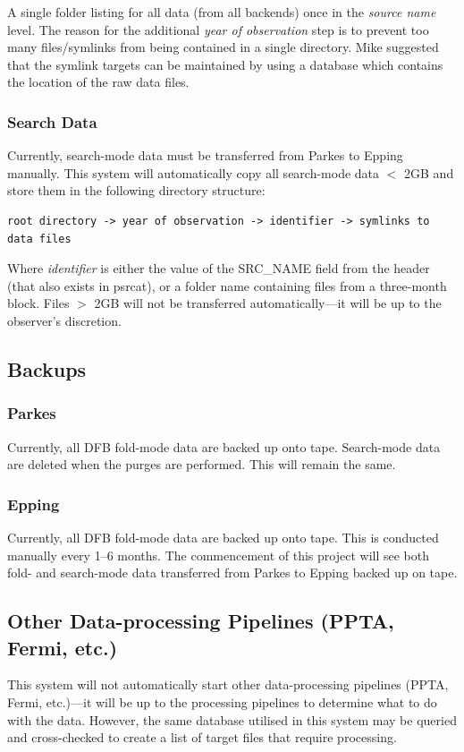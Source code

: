 \documentclass[a4paper,11pt]{article}
\begin{document}
A single folder listing for all data (from all backends) once in the \emph{source name} level. The reason for the additional \emph{year of observation} step is to prevent too many files/symlinks from being contained in a single directory. Mike suggested that the symlink targets can be maintained by using a database which contains the location of the raw data files.

\subsubsection{Search Data}
Currently, search-mode data must be transferred from Parkes to Epping manually. This system will automatically copy all search-mode data $<$ 2GB and store them in the following directory structure:

\begin{verbatim}
root directory -> year of observation -> identifier -> symlinks to data files
\end{verbatim}

Where \emph{identifier} is either the value of the SRC\_NAME field from the header (that also exists in psrcat), or a folder name containing files from a three-month block. Files $>$ 2GB will not be transferred automatically---it will be up to the observer's discretion.

\subsection{Backups}
\subsubsection{Parkes}
Currently, all DFB fold-mode data are backed up onto tape. Search-mode data are deleted when the purges are performed. This will remain the same.

\subsubsection{Epping}
Currently, all DFB fold-mode data are backed up onto tape. This is conducted manually every 1--6 months. The commencement of this project will see both fold- and search-mode data transferred from Parkes to Epping backed up on tape.

\subsection{Other Data-processing Pipelines (PPTA, Fermi, etc.)}
This system will not automatically start other data-processing pipelines (PPTA, Fermi, etc.)---it will be up to the processing pipelines to determine what to do with the data. However, the same database utilised in this system may be queried and cross-checked to create a list of target files that require processing.
\end{document}
